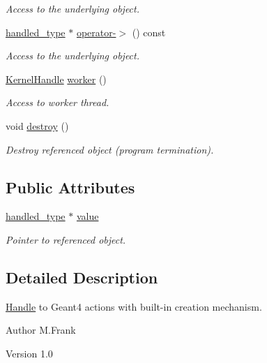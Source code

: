 \begin{DoxyCompactItemize}
\begin{DoxyCompactList}\small\item\em Access to the underlying object. \item\end{DoxyCompactList}\item 
\hyperlink{class_d_d4hep_1_1_simulation_1_1_geant4_kernel}{handled\_\-type} $\ast$ \hyperlink{class_d_d4hep_1_1_simulation_1_1_kernel_handle_a564370b54320769d1e879ab0adc09d82}{operator-\/$>$} () const 
\begin{DoxyCompactList}\small\item\em Access to the underlying object. \item\end{DoxyCompactList}\item 
\hyperlink{class_d_d4hep_1_1_simulation_1_1_kernel_handle}{KernelHandle} \hyperlink{class_d_d4hep_1_1_simulation_1_1_kernel_handle_a456dfc14c139dfc0e7dc06e0d891fd15}{worker} ()
\begin{DoxyCompactList}\small\item\em Access to worker thread. \item\end{DoxyCompactList}\item 
void \hyperlink{class_d_d4hep_1_1_simulation_1_1_kernel_handle_a955f15990b4af24d3e862c45b99e041f}{destroy} ()
\begin{DoxyCompactList}\small\item\em Destroy referenced object (program termination). \item\end{DoxyCompactList}\end{DoxyCompactItemize}
\subsection*{Public Attributes}
\begin{DoxyCompactItemize}
\item 
\hyperlink{class_d_d4hep_1_1_simulation_1_1_geant4_kernel}{handled\_\-type} $\ast$ \hyperlink{class_d_d4hep_1_1_simulation_1_1_kernel_handle_a1d57797e5b730bb29365c2cd92911582}{value}
\begin{DoxyCompactList}\small\item\em Pointer to referenced object. \item\end{DoxyCompactList}\end{DoxyCompactItemize}


\subsection{Detailed Description}
\hyperlink{class_d_d4hep_1_1_handle}{Handle} to Geant4 actions with built-\/in creation mechanism. \begin{DoxyAuthor}{Author}
M.Frank 
\end{DoxyAuthor}
\begin{DoxyVersion}{Version}
1.0 
\end{DoxyVersion}


